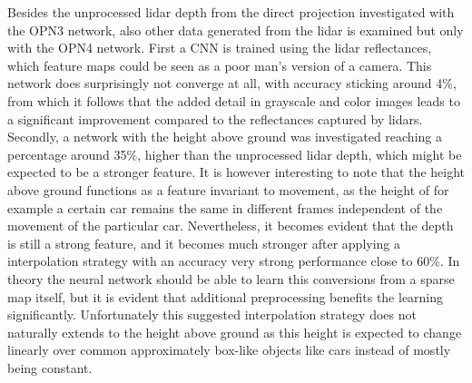 Besides the unprocessed lidar depth from the direct projection investigated with the OPN3 network, also other data generated from the lidar is examined but only with the OPN4 network. First a CNN is trained using the lidar reflectances, which feature maps could be seen as a poor man's version of a camera. This network does surprisingly not converge at all, with accuracy sticking around 4\%, from which it follows that the added detail in grayscale and color images leads to a significant improvement compared to the reflectances captured by lidars. Secondly, a network with the height above ground was investigated reaching a percentage around 35\%, higher than the unprocessed lidar depth, which might be expected to be a stronger feature. It is however interesting to note that the height above ground functions as a feature invariant to movement, as the height of for example a certain car remains the same in different frames independent of the movement of the particular car. Nevertheless, it becomes evident that the depth is still a strong feature, and it becomes much stronger after applying a interpolation strategy with an accuracy very strong performance close to 60\%. In theory the neural network should be able to learn this conversions from a sparse map itself, but it is evident that additional preprocessing benefits the learning significantly. Unfortunately this suggested interpolation strategy does not naturally extends to the height above ground as this height is expected to change linearly over common approximately box-like objects like cars instead of mostly being constant. 



